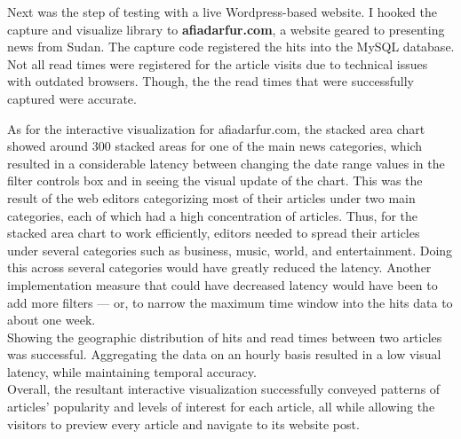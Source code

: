 \documentclass[12pt]{article}
\begin{document}
{Next was the step of testing with a live Wordpress-based website. I hooked the capture and visualize library to \textbf{afiadarfur.com}, a website geared to presenting news from Sudan. The capture code registered the hits into the MySQL database. Not all read times were registered for the article visits due to technical issues with outdated browsers. Though, the the read times that were successfully captured were accurate. 
  
As for the interactive visualization for afiadarfur.com, the stacked area chart showed around 300 stacked areas for one of the main news categories, which resulted in a considerable latency between changing the date range values in the filter controls box and in seeing the visual update of the chart. This was the result of the web editors categorizing most of their articles under two main categories, each of which had a high concentration of articles. Thus, for the stacked area chart to work efficiently, editors needed to spread their articles under several categories such as business, music, world, and entertainment. Doing this across several categories would have greatly reduced the latency. Another implementation measure that could have decreased latency would have been to add more filters --- or, to narrow the maximum time window into the hits data to about one week. \\
Showing the geographic distribution of hits and read times between two articles was successful. Aggregating the data on an hourly basis resulted in a low visual latency, while maintaining temporal accuracy. \\

Overall, the resultant interactive visualization successfully conveyed patterns of articles' popularity and levels of interest for each article, all while allowing the visitors to preview every article and navigate to its website post.

\newpage

}
\end{document}
